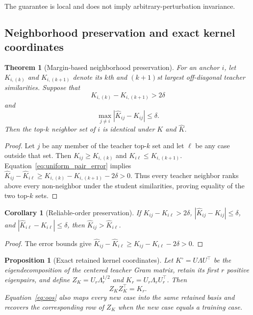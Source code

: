 \documentclass[pdflatex,sn-mathphys-num]{sn-jnl}
\newcommand{\1}{\mathbf{1}}
\theoremstyle{plain}
\newtheorem{theorem}{Theorem}
\newtheorem{proposition}{Proposition}
\newtheorem{corollary}{Corollary}
\begin{document}
	The guarantee is local and does not imply arbitrary-perturbation invariance.
	
	\subsection{Neighborhood preservation and exact kernel coordinates}
	
	\begin{theorem}[Margin-based neighborhood preservation]
		\label{thm:neighbors}
		For an anchor $i$, let $K_{i,(k)}$ and $K_{i,(k+1)}$ denote its $k$th
		and $(k+1)$st largest off-diagonal teacher similarities. Suppose that
		\begin{equation}
			K_{i,(k)}-K_{i,(k+1)}>2\delta
			\label{eq:neighbor_margin}
		\end{equation}
		and
		\begin{equation}
			\max_{j\neq i}
			|\widehat K_{ij}-K_{ij}|
			\leq\delta.
			\label{eq:uniform_pair_error}
		\end{equation}
		Then the top-$k$ neighbor set of $i$ is identical under $K$ and
		$\widehat K$.
	\end{theorem}
	
	\begin{proof}
		Let $j$ be any member of the teacher top-$k$ set and let $\ell$ be any
		case outside that set. Then $K_{ij}\geq K_{i,(k)}$ and $K_{i\ell}\leq K_{i,(k+1)}$. Equation~\eqref{eq:uniform_pair_error} implies $\widehat K_{ij}-\widehat K_{i\ell}\geq K_{i,(k)}-K_{i,(k+1)}-2\delta>0$.
		Thus every teacher neighbor ranks above every non-neighbor under the
		student similarities, proving equality of the two top-$k$ sets.
	\end{proof}
	
	\begin{corollary}[Reliable-order preservation]
		\label{cor:order}
		If $K_{ij}-K_{i\ell}>2\delta$, $|\widehat K_{ij}-K_{ij}|\leq\delta$, and $|\widehat K_{i\ell}-K_{i\ell}|\leq\delta$, then $\widehat K_{ij}>\widehat K_{i\ell}$.
	\end{corollary}
	
	\begin{proof}
		The error bounds give $\widehat K_{ij}-\widehat K_{i\ell}\geq K_{ij}-K_{i\ell}-2\delta>0$.
	\end{proof}
	
	\begin{proposition}[Exact retained kernel coordinates]
		\label{prop:coords}
		Let $K^\circ=U\Lambda U^\top$ be the eigendecomposition of the centered teacher Gram matrix, retain its first $r$ positive eigenpairs, and define $Z_K=U_r\Lambda_r^{1/2}$ and $K_r=U_r\Lambda_rU_r^\top$.
		Then
		\begin{equation}
			Z_KZ_K^\top=K_r.
			\label{eq:retained_gram}
		\end{equation}
		Equation~\eqref{eq:oos} also maps every new case into the same
		retained basis and recovers the corresponding row of $Z_K$ when the
		new case equals a training case.
	\end{proposition}
	
\end{document}
